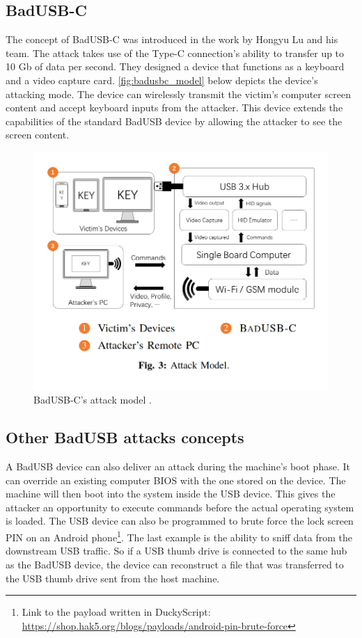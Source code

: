 \subsection*{BadUSB-C}
The concept of BadUSB-C was introduced in the work by Hongyu Lu and his team\cite{badusbc}. The attack takes use of the Type-C connection's ability to transfer up to 10 Gb of data per second. They designed a device that functions as a keyboard and a video capture card. \autoref{fig:badusbc_model} below depicts the device's attacking mode. The device can wirelessly transmit the victim's computer screen content and accept keyboard inputs from the attacker. This device extends the capabilities of the standard BadUSB device by allowing the attacker to see the screen content.
\begin{figure}[ht]
    \centering
    \includegraphics[width=0.7\linewidth]{obrazky-figures/badusbc_attack.png}
    \caption{BadUSB-C's attack model \cite{badusbc}.}
    \label{fig:badusbc_model}
\end{figure}

\subsection*{Other BadUSB attacks concepts}
A BadUSB device can also deliver an attack during the machine's boot phase. It can override an existing computer BIOS with the one stored on the device. The machine will then boot into the system inside the USB device. This gives the attacker an opportunity to execute commands before the actual operating system is loaded. The USB device can also be programmed to brute force the lock screen PIN on an Android phone\footnote{Link to the payload written in DuckyScript: \url{https://shop.hak5.org/blogs/payloads/android-pin-brute-force}}. The last example is the ability to sniff data from the downstream USB traffic. So if a USB thumb drive is connected to the same hub as the BadUSB device, the device can reconstruct a file that was transferred to the USB thumb drive sent from the host machine.

